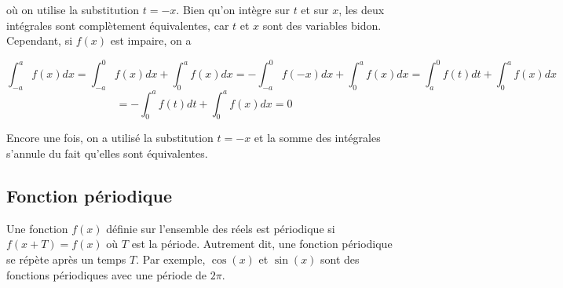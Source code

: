 où on utilise la substitution $t = -x$. Bien qu'on intègre sur $t$ et sur $x$, les deux intégrales sont complètement équivalentes, car $t$ et $x$ sont des variables bidon. Cependant, si $f(x)$ est impaire, on a 

\begin{equation*}
    \int_{-a}^{a}f(x)dx = \int_{-a}^{0}f(x)dx + \int_{0}^{a}f(x)dx = -\int_{-a}^{0}f(-x)dx + \int_{0}^{a}f(x)dx = \int_{a}^{0}f(t)dt + \int_{0}^{a}f(x)dx
\end{equation*}
\begin{equation*}
    = -\int_{0}^{a}f(t)dt + \int_{0}^{a}f(x)dx = 0
\end{equation*}

Encore une fois, on a utilisé la substitution $t = -x$ et la somme des intégrales s'annule du fait qu'elles sont équivalentes. 





\subsection{Fonction périodique}
Une fonction $f(x)$ définie sur l'ensemble des réels est périodique si $f(x + T) = f(x)$ où $T$ est la période. Autrement dit, une fonction périodique se répète après un temps $T$. Par exemple, $\cos(x)$ et $\sin(x)$ sont des fonctions périodiques avec une période de $2\pi$. 

